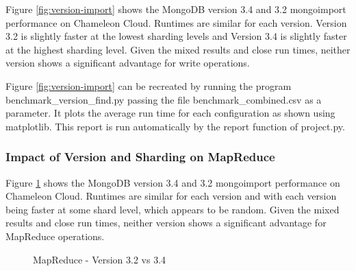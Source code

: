 \documentclass[9pt,twocolumn,twoside]{../../styles/osajnl}
\begin{document}
Figure \ref{fig:version-import} shows the MongoDB version 3.4 and 3.2
mongoimport performance on Chameleon Cloud. Runtimes are similar for
each version. Version 3.2 is slightly faster at the lowest sharding
levels and Version 3.4 is slightly faster at the highest sharding
level. Given the mixed results and close run times, neither version
shows a significant advantage for write operations.

Figure \ref{fig:version-import} can be recreated by running the
program benchmark\_version\_find.py passing the file
benchmark\_combined.csv as a parameter. It plots the average run time
for each configuration as shown using matplotlib. This report is run
automatically by the report function of project.py.



\subsubsection{Impact of Version and Sharding on MapReduce}

Figure \ref{fig:version-mapreduce} shows the MongoDB version 3.4 and
3.2 mongoimport performance on Chameleon Cloud. Runtimes are similar
for each version and with each version being faster at some shard
level, which appears to be random. Given the mixed results and close
run times, neither version shows a significant advantage for MapReduce
operations.

\begin{figure}[htbp]
\centering
{}
\caption{MapReduce - Version 3.2 vs 3.4}
\label{fig:version-mapreduce}
\end{figure}
\end{document}
